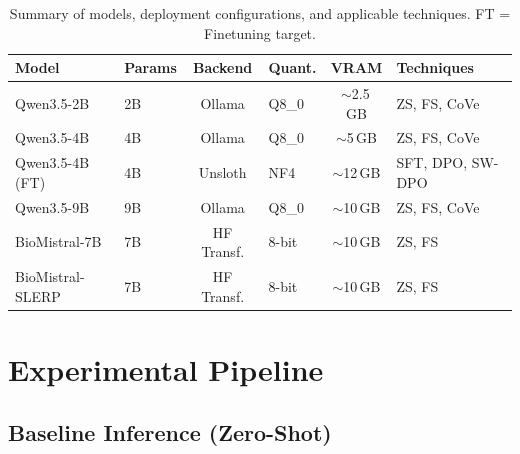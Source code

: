 \documentclass[12pt,a4paper,oneside]{report}
\begin{document}
\begin{table}[htbp]
\centering
\caption{Summary of models, deployment configurations, and applicable techniques. FT = Finetuning target.}
\label{tab:model-summary}
\begin{tabular}{llclcl}
\toprule
\textbf{Model} & \textbf{Params} & \textbf{Backend} & \textbf{Quant.} & \textbf{VRAM} & \textbf{Techniques} \\
\midrule
Qwen3.5-2B       & 2B  & Ollama       & Q8\_0  & $\sim$2.5\,GB & ZS, FS, CoVe \\
Qwen3.5-4B       & 4B  & Ollama       & Q8\_0  & $\sim$5\,GB   & ZS, FS, CoVe \\
Qwen3.5-4B (FT)  & 4B  & Unsloth      & NF4    & $\sim$12\,GB  & SFT, DPO, SW-DPO \\
Qwen3.5-9B       & 9B  & Ollama       & Q8\_0  & $\sim$10\,GB  & ZS, FS, CoVe \\
BioMistral-7B    & 7B  & HF Transf.   & 8-bit  & $\sim$10\,GB  & ZS, FS \\
BioMistral-SLERP & 7B  & HF Transf.   & 8-bit  & $\sim$10\,GB  & ZS, FS \\
\bottomrule
\end{tabular}
\end{table}



\section{Experimental Pipeline}
\label{sec:pipeline}


\subsection{Baseline Inference (Zero-Shot)}
\label{subsec:baseline}
\end{document}
